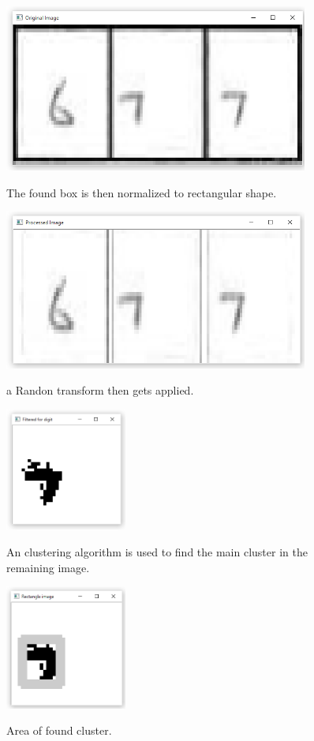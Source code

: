 \begin{figure}
  \centering
  \includegraphics[width=10cm]{BeforeProcessing}\\
  \caption{The found box is then normalized to rectangular shape.}
  \label{fig:bp}
\end{figure}

\begin{figure}
  \centering
  \includegraphics[width=10cm]{AfterRadon}\\
  \caption{a Randon transform then gets applied.}
  \label{fig:ar}
\end{figure}

\begin{figure}
  \centering
  \includegraphics[width=4cm]{Cluster}\\
  \caption{An clustering algorithm is used to find the main cluster in the remaining image.}
  \label{fig:c}
\end{figure}

\begin{figure}
  \centering
  \includegraphics[width=4cm]{DetectArea}\\
  \caption{Area of found cluster.}
  \label{fig:areaLoc}
\end{figure}

